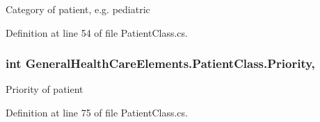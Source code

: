 Category of patient, e.\+g. pediatric 



Definition at line 54 of file Patient\+Class.\+cs.

\subsubsection[{\texorpdfstring{Priority}{Priority}}]{\setlength{\rightskip}{0pt plus 5cm}int General\+Health\+Care\+Elements.\+Patient\+Class.\+Priority\hspace{0.3cm}{\ttfamily [get]}, {\ttfamily [set]}}\hypertarget{class_general_health_care_elements_1_1_patient_class_af9e113df6b154c3ea6ebb6c3a380e31f}{}\label{class_general_health_care_elements_1_1_patient_class_af9e113df6b154c3ea6ebb6c3a380e31f}


Priority of patient 



Definition at line 75 of file Patient\+Class.\+cs.

